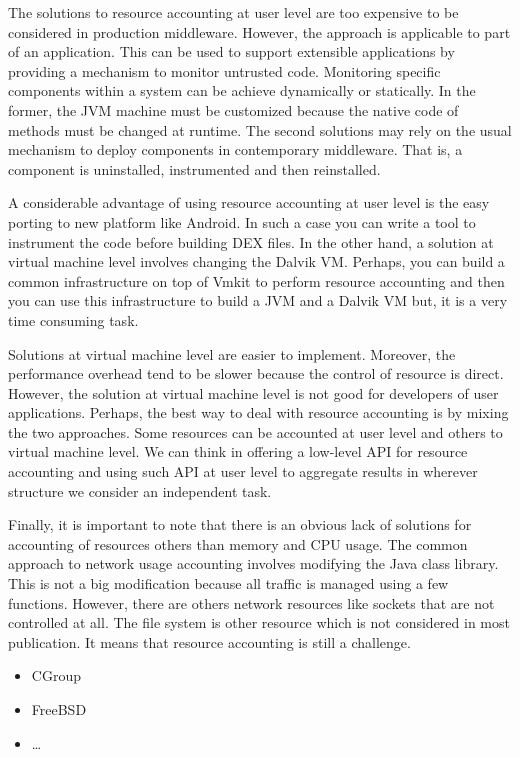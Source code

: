 The solutions to resource accounting at user level are too expensive to be considered in production middleware. However, the approach is applicable to part of an application. This can be used to support extensible applications by providing a mechanism to monitor untrusted code. Monitoring specific components within a system can be achieve dynamically or statically. In the former, the JVM machine must be customized because the native code of methods must be changed at runtime. The second solutions may rely on the usual mechanism to deploy components in contemporary middleware. That is, a component is uninstalled, instrumented and then reinstalled.

A considerable advantage of using resource accounting at user level is the easy porting to new platform like Android. In such a case you can write a tool to instrument the code before building DEX files. In the other hand, a solution at virtual machine level involves changing the Dalvik VM. Perhaps, you can build a common infrastructure on top of Vmkit to perform resource accounting and then you can use this infrastructure to build a JVM and a Dalvik VM but, it is a very time consuming task.

Solutions at virtual machine level are easier to implement. Moreover, the performance overhead tend to be slower because the control of resource is direct. However, the solution at virtual machine level is not good for developers of user applications. Perhaps, the best way to deal with resource accounting is by mixing the two approaches. Some resources can be accounted at user level and others to virtual machine level. We can think in offering a low-level API for resource accounting and using such API at user level to aggregate results in wherever structure we consider an independent task.

Finally, it is important to note that there is an obvious lack of solutions for accounting of resources others than memory and CPU usage. The common approach to network usage accounting involves modifying the Java class library. This is not a big modification because all traffic is managed using a few functions. However, there are others network resources like sockets that are not controlled at all. The file system is other resource which is not considered in most publication. It means that resource accounting is still a challenge.


\begin{itemize}
\item CGroup
\item FreeBSD
\item \dots
\end{itemize}

